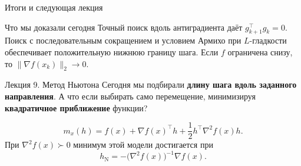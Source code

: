 \documentclass[aspectratio=169,10pt]{beamer}
\begin{document}
\begin{frame}{Итоги и следующая лекция}
\small
\begin{block}{Что мы доказали сегодня}
Точный поиск вдоль антиградиента даёт $g_{k+1}^\top g_k=0$.
Поиск с последовательным сокращением и условием Армихо при
$L$-гладкости обеспечивает положительную нижнюю границу шага.
Если $f$ ограничена снизу, то $\|\nabla f(x_k)\|_2\to0$.
\end{block}

\begin{alertblock}{Лекция 9. Метод Ньютона}
Сегодня мы подбирали \textbf{длину шага вдоль заданного направления}.
А что если выбирать само перемещение, минимизируя
\textbf{квадратичное приближение} функции?
\end{alertblock}
\[
m_x(h)=f(x)+\nabla f(x)^\top h+
\frac12 h^\top\nabla^2f(x)h.
\]
При $\nabla^2f(x)\succ0$ минимум этой модели достигается при
\[
\boxed{h_{\mathrm N}=-\bigl(\nabla^2f(x)\bigr)^{-1}\nabla f(x).}
\]
\end{frame}
\end{document}
